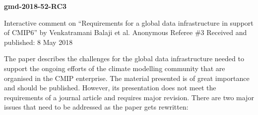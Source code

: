 \documentclass[gmd,manuscript]{copernicus}
\begin{document}
\pagebreak


\textbf{gmd-2018-52-RC3}

Interactive comment on “Requirements for a
global data infrastructure in support of CMIP6” by
Venkatramani Balaji et al.
Anonymous Referee \#3
Received and published: 8 May 2018

The paper describes the challenges for the global data infrastructure
needed to support the ongoing efforts of the climate modelling
community that are organised in the CMIP enterprise. The material
presented is of great importance and should be published. However, its
presentation does not meet the requirements of a journal article and
requires major revision. There are two major issues that need to be
addressed as the paper gets rewritten:
\end{document}
